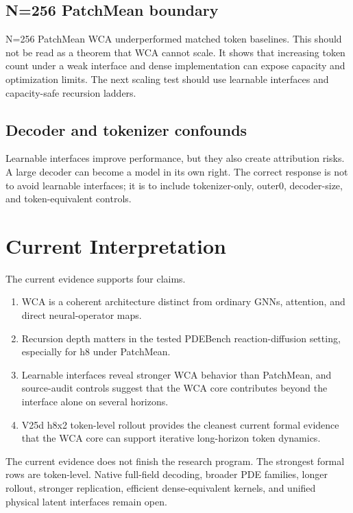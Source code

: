 \documentclass[11pt]{article}
\begin{document}
\subsection{N=256 PatchMean boundary}

N=256 PatchMean WCA underperformed matched token baselines. This should not be
read as a theorem that WCA cannot scale. It shows that increasing token count
under a weak interface and dense implementation can expose capacity and
optimization limits. The next scaling test should use learnable interfaces and
capacity-safe recursion ladders.

\subsection{Decoder and tokenizer confounds}

Learnable interfaces improve performance, but they also create attribution
risks. A large decoder can become a model in its own right. The correct
response is not to avoid learnable interfaces; it is to include tokenizer-only,
outer0, decoder-size, and token-equivalent controls.

\section{Current Interpretation}

The current evidence supports four claims.

\begin{enumerate}[leftmargin=2em]
  \item WCA is a coherent architecture distinct from ordinary GNNs, attention,
  and direct neural-operator maps.
  \item Recursion depth matters in the tested PDEBench reaction-diffusion
  setting, especially for h8 under PatchMean.
  \item Learnable interfaces reveal stronger WCA behavior than PatchMean, and
  source-audit controls suggest that the WCA core contributes beyond the
  interface alone on several horizons.
  \item V25d h8x2 token-level rollout provides the cleanest current formal
  evidence that the WCA core can support iterative long-horizon token dynamics.
\end{enumerate}

The current evidence does not finish the research program. The strongest
formal rows are token-level. Native full-field decoding, broader PDE families,
longer rollout, stronger replication, efficient dense-equivalent kernels, and
unified physical latent interfaces remain open.
\end{document}

